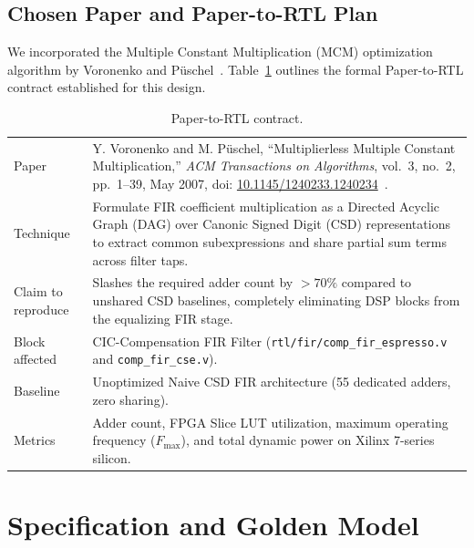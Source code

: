 \documentclass[11pt,a4paper]{article}
\begin{document}
\subsection{Chosen Paper and Paper-to-RTL Plan}
We incorporated the Multiple Constant Multiplication (MCM) optimization algorithm by Voronenko and P\"uschel~\cite{voronenko2007}. Table~\ref{tab:contract} outlines the formal Paper-to-RTL contract established for this design.

\begin{table}[H]\centering\small
\caption{Paper-to-RTL contract.}\label{tab:contract}
\begin{tabularx}{\linewidth}{@{}lX@{}}
\toprule
Paper & Y. Voronenko and M. P\"uschel, ``Multiplierless Multiple Constant Multiplication,'' \emph{ACM Transactions on Algorithms}, vol.~3, no.~2, pp.~1--39, May 2007, doi: \href{https://doi.org/10.1145/1240233.1240234}{10.1145/1240233.1240234}~\cite{voronenko2007}.\\
Technique & Formulate FIR coefficient multiplication as a Directed Acyclic Graph (DAG) over Canonic Signed Digit (CSD) representations to extract common subexpressions and share partial sum terms across filter taps.\\
Claim to reproduce & Slashes the required adder count by $>70\%$ compared to unshared CSD baselines, completely eliminating DSP blocks from the equalizing FIR stage.\\
Block affected & CIC-Compensation FIR Filter (\texttt{rtl/fir/comp\_fir\_espresso.v} and \texttt{comp\_fir\_cse.v}).\\
Baseline & Unoptimized Naive CSD FIR architecture (55 dedicated adders, zero sharing).\\
Metrics & Adder count, FPGA Slice LUT utilization, maximum operating frequency ($F_{\text{max}}$), and total dynamic power on Xilinx 7-series silicon.\\
\bottomrule
\end{tabularx}
\end{table}

\section{Specification and Golden Model}
\label{sec:spec}
\end{document}
